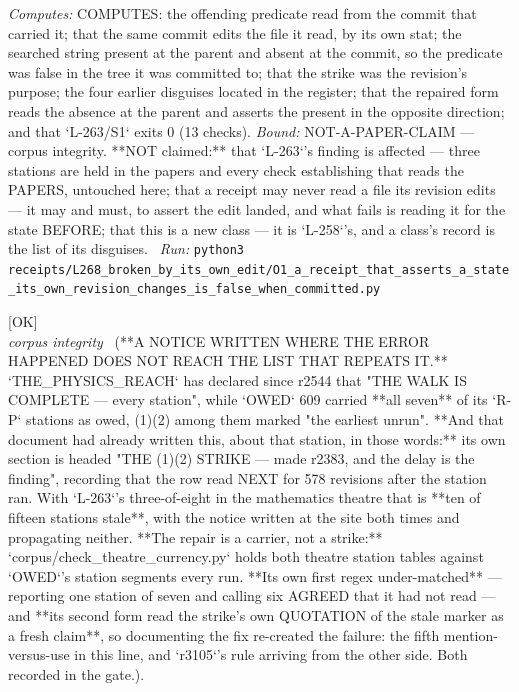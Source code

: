 \begin{description}
\emph{Computes:} COMPUTES: the offending predicate read from the commit that carried it; that the same commit edits the file it read, by its own stat; the searched string present at the parent and absent at the commit, so the predicate was false in the tree it was committed to; that the strike was the revision's purpose; the four earlier disguises located in the register; that the repaired form reads the absence at the parent and asserts the present in the opposite direction; and that `L-263/S1` exits 0 (13 checks).
 \emph{Bound:} NOT-A-PAPER-CLAIM --- corpus integrity. **NOT claimed:** that `L-263`'s finding is affected --- three stations are held in the papers and every check establishing that reads the PAPERS, untouched here; that a receipt may never read a file its revision edits --- it may and must, to assert the edit landed, and what fails is reading it for the state BEFORE; that this is a new class --- it is `L-258`'s, and a class's record is the list of its disguises.
\ \emph{Run:} \texttt{python3 receipts/L268\_broken\_by\_its\_own\_edit/O1\_a\_receipt\_that\_asserts\_a\_state\_its\_own\_revision\_changes\_is\_false\_when\_committed.py}
\item[\label{rcpt:T1_the_whole_physics_theatre_declared_its_walk_complete_and_the_list_carried_all_seven}\texttt{T1\_the\_whole\_physics\_theatre\_declared\_its\_walk\_complete\_and\_the\_list\_carried\_all\_seven}]\hfill\textsf{[OK]}\\
\textit{corpus integrity} \ (**A NOTICE WRITTEN WHERE THE ERROR HAPPENED DOES NOT REACH THE LIST THAT REPEATS IT.** `THE\_PHYSICS\_REACH` has declared since r2544 that "THE WALK IS COMPLETE --- every station", while `OWED` 609 carried **all seven** of its `R-P` stations as owed, (1)(2) among them marked "the earliest unrun". **And that document had already written this, about that station, in those words:** its own section is headed "THE (1)(2) STRIKE --- made r2383, and the delay is the finding", recording that the row read NEXT for 578 revisions after the station ran. With `L-263`'s three-of-eight in the mathematics theatre that is **ten of fifteen stations stale**, with the notice written at the site both times and propagating neither. **The repair is a carrier, not a strike:** `corpus/check\_theatre\_currency.py` holds both theatre station tables against `OWED`'s station segments every run. **Its own first regex under-matched** --- reporting one station of seven and calling six AGREED that it had not read --- and **its second form read the strike's own QUOTATION of the stale marker as a fresh claim**, so documenting the fix re-created the failure: the fifth mention-versus-use in this line, and `r3105`'s rule arriving from the other side. Both recorded in the gate.). 

\end{description}

